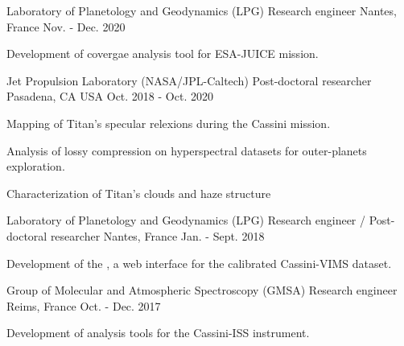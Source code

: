 
\begin{cventries}

  \cventry
  {Laboratory of Planetology and Geodynamics (LPG)}
  {Research engineer}
  {Nantes, France}
  {Nov. - Dec. 2020}
  {
    \begin{cvitems}
      \item{Development of covergae analysis tool for ESA-JUICE mission.}
    \end{cvitems}
    \vspace{1em}
  }

  \cventry
    {Jet Propulsion Laboratory (NASA/JPL-Caltech)}
    {Post-doctoral researcher}
    {Pasadena, CA USA}
    {Oct. 2018 - Oct. 2020}
    {
      \begin{cvitems}
        \item{Mapping of Titan's specular relexions during the Cassini mission.}
        \item{Analysis of lossy compression on hyperspectral datasets for outer-planets exploration.}
        \item{Characterization of Titan's clouds and haze structure}
      \end{cvitems}
      \vspace{1em}
    }

  \cventry
    {Laboratory of Planetology and Geodynamics (LPG)}
    {Research engineer / Post-doctoral researcher}
    {Nantes, France}
    {Jan. - Sept. 2018}
    {
      \begin{cvitems}
        \item{Development of the
        ,
        a web interface for the calibrated Cassini-VIMS dataset.}
      \end{cvitems}
      \vspace{1em}
    }

  \cventry
    {Group of Molecular and Atmospheric Spectroscopy (GMSA)}
    {Research engineer}
    {Reims, France}
    {Oct. - Dec. 2017}
    {
      \begin{cvitems}
        \item{Development of analysis tools for the Cassini-ISS instrument.}
      \end{cvitems}
      \vspace{1em}
    }

\end{cventries}

